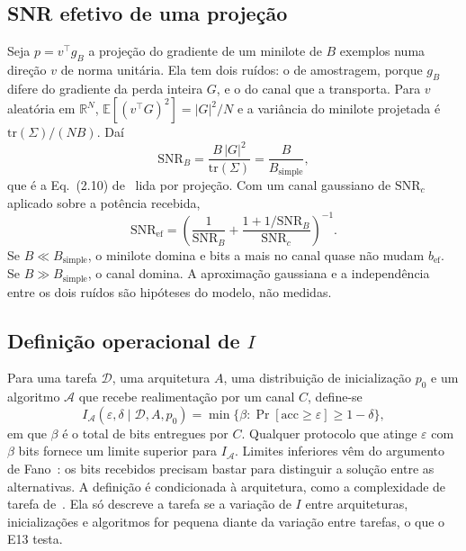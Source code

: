 \documentclass[journal]{IEEEtran}
\newcommand{\SNR}{\mathrm{SNR}}
\begin{document}
\subsection{SNR efetivo de uma projeção}

Seja $p = v^\top g_B$ a projeção do gradiente de um minilote de $B$ exemplos numa direção $v$ de norma unitária. Ela tem dois ruídos: o de amostragem, porque $g_B$ difere do gradiente da perda inteira $G$, e o do canal que a transporta. Para $v$ aleatória em $\mathbb{R}^N$, $\mathbb{E}[(v^\top G)^2] = |G|^2/N$ e a variância do minilote projetada é $\mathrm{tr}(\Sigma)/(NB)$. Daí
\begin{equation}
\label{eq:snrb}
\SNR_B = \frac{B\,|G|^2}{\mathrm{tr}(\Sigma)} = \frac{B}{B_{\text{simple}}},
\end{equation}
que é a Eq.~(2.10) de~\cite{mccandlish2018} lida por projeção. Com um canal gaussiano de $\SNR_c$ aplicado sobre a potência recebida,
\begin{equation}
\label{eq:snref}
\SNR_{\text{ef}} = \left(\frac{1}{\SNR_B} + \frac{1 + 1/\SNR_B}{\SNR_c}\right)^{-1}.
\end{equation}
Se $B \ll B_{\text{simple}}$, o minilote domina e bits a mais no canal quase não mudam $b_{\text{ef}}$. Se $B \gg B_{\text{simple}}$, o canal domina. A aproximação gaussiana e a independência entre os dois ruídos são hipóteses do modelo, não medidas.

\subsection{Definição operacional de $I$}

Para uma tarefa $\mathcal{D}$, uma arquitetura $A$, uma distribuição de inicialização $p_0$ e um algoritmo $\mathcal{A}$ que recebe realimentação por um canal $C$, define-se
\begin{equation}
\label{eq:I}
I_{\mathcal{A}}(\varepsilon,\delta \mid \mathcal{D},A,p_0) = \min\{\beta : \Pr[\mathrm{acc} \ge \varepsilon] \ge 1-\delta\},
\end{equation}
em que $\beta$ é o total de bits entregues por $C$. Qualquer protocolo que atinge $\varepsilon$ com $\beta$ bits fornece um limite superior para $I_{\mathcal{A}}$. Limites inferiores vêm do argumento de Fano~\cite{agarwal2012}: os bits recebidos precisam bastar para distinguir a solução entre as alternativas. A definição é condicionada à arquitetura, como a complexidade de tarefa de~\cite{achille2019}. Ela só descreve a tarefa se a variação de $I$ entre arquiteturas, inicializações e algoritmos for pequena diante da variação entre tarefas, o que o E13 testa.
\end{document}
